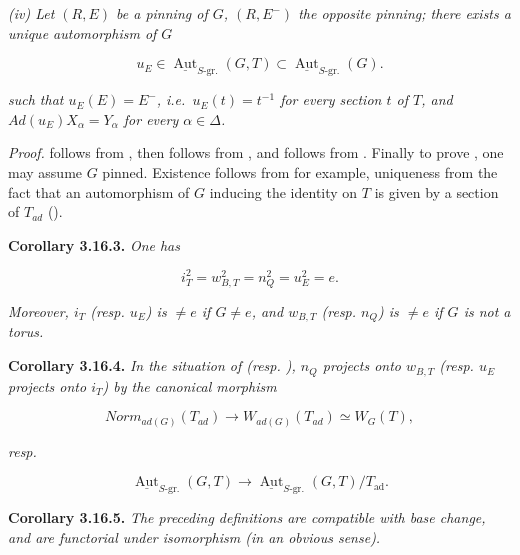 \emph{(iv) Let \((R, E)\) be a pinning of \(G\), \((R, E^{-})\) the opposite pinning; there exists a unique automorphism of \(G\)}

\[
  u_E\in
  \underline{\operatorname{Aut}}_{S\text{-}\mathrm{gr.}}(G,T)
  \subset
  \underline{\operatorname{Aut}}_{S\text{-}\mathrm{gr.}}(G).
\]

\emph{such that \(u_{E}(E) = E^{-}\), i.e.~\(u_{E}(t) = t^{-1}\) for every section \(t\) of \(T\), and \(Ad(u_{E}) X_{\alpha} =
Y_{\alpha}\) for every \(\alpha \in \Delta\).}

\emph{Proof.}  follows from , then  follows from , and  follows from .
Finally to prove , one may assume \(G\) pinned. Existence follows from  for example, uniqueness from the fact that
an automorphism of \(G\) inducing the identity on \(T\) is given by a section of \(T_{ad}\) ().

\textbf{Corollary 3.16.3.} \emph{One has}

\[
  i_T^2=w_{B,T}^2=n_Q^2=u_E^2=e.
\]

\emph{Moreover, \(i_{T}\) (resp. \(u_{E}\)) is \(\neq e\) if \(G \neq e\), and \(w_{B, T}\) (resp. \(n_{Q}\)) is \(\neq e\) if \(G\) is not a
torus.}

\textbf{Corollary 3.16.4.} \emph{In the situation of  (resp. ), \(n_{Q}\) projects onto \(w_{B, T}\) (resp. \(u_{E}\) projects
onto \(i_{T}\)) by the canonical morphism}

\[ Norm_{ad(G)}(T_{ad}) \to W_{ad(G)}(T_{ad}) \simeq W_{G}(T), \]

\emph{resp.}

\[
  \underline{\operatorname{Aut}}_{S\text{-}\mathrm{gr.}}(G,T)
  \longrightarrow
  \underline{\operatorname{Aut}}_{S\text{-}\mathrm{gr.}}(G,T)/T_{\mathrm{ad}}.
\]

\textbf{Corollary 3.16.5.} \emph{The preceding definitions are compatible with base change, and are functorial under isomorphism
(in an obvious sense).}

